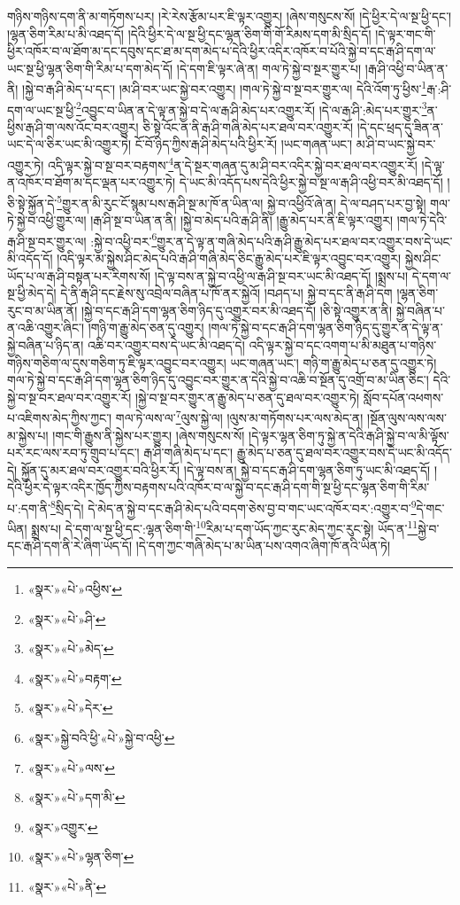 གཉིས་གཉིས་དག་ནི་མ་གཏོགས་པར། །རེ་རེས་རྩོམ་པར་ཇི་ལྟར་འགྱུར། །ཞེས་གསུངས་སོ། །དེ་ཕྱིར་དེ་ལ་སྔ་ཕྱི་དང་། །ལྷན་ཅིག་རིམ་པ་མི་འཐད་དོ། །དེའི་ཕྱིར་དེ་ལ་སྔ་ཕྱི་དང་ལྷན་ཅིག་གི་གོ་རིམས་དག་མི་སྲིད་དོ། །དེ་ལྟར་གང་གི་ཕྱིར་འཁོར་བ་ལ་ཐོག་མ་དང་དབུས་དང་ཐ་མ་དག་མེད་པ་དེའི་ཕྱིར་འདིར་འཁོར་བ་པོའི་སྐྱེ་བ་དང་རྒ་ཤི་དག་ལ་ཡང་སྔ་ཕྱི་ལྷན་ཅིག་གི་རིམ་པ་དག་མེད་དོ། །དེ་དག་ཇི་ལྟར་ཞེ་ན། གལ་ཏེ་སྐྱེ་བ་སྔར་གྱུར་པ། །རྒ་ཤི་འཕྱི་བ་ཡིན་ན་ནི། །སྐྱེ་བ་རྒ་ཤི་མེད་པ་དང་། །མ་ཤི་བར་ཡང་སྐྱེ་བར་འགྱུར། །གལ་ཏེ་སྐྱེ་བ་སྔ་བར་གྱུར་ལ། དེའི་འོག་ཏུ་ཕྱིས་\footnote{«སྣར་»«པེ་»འཕྱིས་}རྒ་:ཤི་དག་ལ་ཡང་སྔ་ཕྱི་\footnote{«སྣར་»«པེ་»ཤི་}འབྱུང་བ་ཡིན་ན་དེ་ལྟ་ན་སྐྱེ་བ་དེ་ལ་རྒ་ཤི་མེད་པར་འགྱུར་རོ། །དེ་ལ་རྒ་ཤི་:མེད་པར་གྱུར་\footnote{«སྣར་»«པེ་»མེད་}ན་ཕྱིས་རྒ་ཤི་ག་ལས་འོང་བར་འགྱུར། ཅི་སྟེ་འོང་ན་ནི་རྒ་ཤི་གཞི་མེད་པར་ཐལ་བར་འགྱུར་རོ། །དེ་དང་ཕྲད་དུ་ཟིན་ན་ཡང་དེ་ལ་ཅིར་ཡང་མི་འགྱུར་ཏེ། ངོ་བོ་ཉིད་ཀྱིས་རྒ་ཤི་མེད་པའི་ཕྱིར་རོ། །ཡང་གཞན་ཡང་། མ་ཤི་བ་ཡང་སྐྱེ་བར་འགྱུར་ཏེ། འདི་ལྟར་སྐྱེ་བ་སྔ་བར་བརྟགས་\footnote{«སྣར་»«པེ་»བརྟག་}ན་དེ་སྔར་གཞན་དུ་མ་ཤི་བར་འདིར་སྐྱེ་བར་ཐལ་བར་འགྱུར་རོ། །དེ་ལྟ་ན་འཁོར་བ་ཐོག་མ་དང་ལྡན་པར་འགྱུར་ཏེ། དེ་ཡང་མི་འདོད་པས་དེའི་ཕྱིར་སྐྱེ་བ་སྔ་ལ་རྒ་ཤི་འཕྱི་བར་མི་འཐད་དོ། །ཅི་སྟེ་སྐྱོན་དེ་\footnote{«སྣར་»«པེ་»དེར་}གྱུར་ན་མི་རུང་ངོ་སྙམ་པས་རྒ་ཤི་སྔ་མ་ཁོ་ན་ཡིན་ལ། སྐྱེ་བ་འཕྱིའོ་ཞེ་ན། དེ་ལ་བཤད་པར་བྱ་སྟེ། གལ་ཏེ་སྐྱེ་བ་འཕྱི་གྱུར་ལ། །རྒ་ཤི་སྔ་བ་ཡིན་ན་ནི། །སྐྱེ་བ་མེད་པའི་རྒ་ཤི་ནི། །རྒྱུ་མེད་པར་ནི་ཇི་ལྟར་འགྱུར། །གལ་ཏེ་དེའི་རྒ་ཤི་སྔ་བར་གྱུར་ལ། :སྐྱེ་བ་འཕྱི་བར་\footnote{«སྣར་»སྐྱེ་བའི་ཕྱི་«པེ་»སྐྱེ་བ་འཕྱི་}གྱུར་ན་དེ་ལྟ་ན་གཞི་མེད་པའི་རྒ་ཤི་རྒྱུ་མེད་པར་ཐལ་བར་འགྱུར་བས་དེ་ཡང་མི་འདོད་དོ། །འདི་ལྟར་མ་སྐྱེས་ཤིང་མེད་པའི་རྒ་ཤི་གཞི་མེད་ཅིང་རྒྱུ་མེད་པར་ཇི་ལྟར་འབྱུང་བར་འགྱུར། སྐྱེས་ཤིང་ཡོད་པ་ལ་རྒ་ཤི་བསྟན་པར་རིགས་སོ། །དེ་ལྟ་བས་ན་སྐྱེ་བ་འཕྱི་ལ་རྒ་ཤི་སྔ་བར་ཡང་མི་འཐད་དོ། །སྨྲས་པ། དེ་དག་ལ་སྔ་ཕྱི་མེད་དེ། དེ་ནི་རྒ་ཤི་དང་རྗེས་སུ་འབྲེལ་བཞིན་པ་ཁོ་ནར་སྐྱེའོ། །བཤད་པ། སྐྱེ་བ་དང་ནི་རྒ་ཤི་དག །ལྷན་ཅིག་རུང་བ་མ་ཡིན་ནོ། །སྐྱེ་བ་དང་རྒ་ཤི་དག་ལྷན་ཅིག་ཉིད་དུ་འགྱུར་བར་མི་འཐད་དོ། །ཅི་སྟེ་འགྱུར་ན་ནི། སྐྱེ་བཞིན་པ་ན་འཆི་འགྱུར་ཞིང་། །གཉི་ག་རྒྱུ་མེད་ཅན་དུ་འགྱུར། །གལ་ཏེ་སྐྱེ་བ་དང་རྒ་ཤི་དག་ལྷན་ཅིག་ཉིད་དུ་གྱུར་ན་དེ་ལྟ་ན་སྐྱེ་བཞིན་པ་ཉིད་ན། འཆི་བར་འགྱུར་བས་དེ་ཡང་མི་འཐད་དེ། འདི་ལྟར་སྐྱེ་བ་དང་འགག་པ་མི་མཐུན་པ་གཉིས་གཉིས་གཅིག་ལ་དུས་གཅིག་ཏུ་ཇི་ལྟར་འབྱུང་བར་འགྱུར། ཡང་གཞན་ཡང་། གཉི་ག་རྒྱུ་མེད་པ་ཅན་དུ་འགྱུར་ཏེ། གལ་ཏེ་སྐྱེ་བ་དང་རྒ་ཤི་དག་ལྷན་ཅིག་ཉིད་དུ་འབྱུང་བར་གྱུར་ན་དེའི་སྐྱེ་བ་འཆི་བ་སྔོན་དུ་འགྲོ་བ་མ་ཡིན་ཅིང་། དེའི་སྐྱེ་བ་སྔ་བར་ཐལ་བར་འགྱུར་རོ། །སྐྱེ་བ་སྔ་བར་གྱུར་ན་རྒྱུ་མེད་པ་ཅན་དུ་ཐལ་བར་འགྱུར་ཏེ། སློབ་དཔོན་འཕགས་པ་འཇིགས་མེད་ཀྱིས་ཀྱང་། གལ་ཏེ་ལས་ལ་\footnote{«སྣར་»«པེ་»ལས་}ལུས་སྐྱེ་ལ། །ལུས་མ་གཏོགས་པར་ལས་མེད་ན། །སྔོན་ལུས་ལས་ལས་མ་སྐྱེས་པ། །གང་གི་རྒྱུས་ནི་སྐྱེས་པར་གྱུར། །ཞེས་གསུངས་སོ། །དེ་ལྟར་ལྷན་ཅིག་ཏུ་སྐྱེ་ན་དེའི་རྒ་ཤི་སྐྱེ་བ་ལ་མི་ལྟོས་པར་རང་ལས་རབ་ཏུ་གྲུབ་པ་དང་། རྒ་ཤི་གཞི་མེད་པ་དང་། རྒྱུ་མེད་པ་ཅན་དུ་ཐལ་བར་འགྱུར་བས་དེ་ཡང་མི་འདོད་དེ། སྐྱོན་དུ་མར་ཐལ་བར་འགྱུར་བའི་ཕྱིར་རོ། །དེ་ལྟ་བས་ན། སྐྱེ་བ་དང་རྒ་ཤི་དག་ལྷན་ཅིག་ཏུ་ཡང་མི་འཐད་དོ། །དེའི་ཕྱིར་དེ་ལྟར་འདིར་ཁྱོད་ཀྱིས་བརྟགས་པའི་འཁོར་བ་ལ་སྐྱེ་བ་དང་རྒ་ཤི་དག་གི་སྔ་ཕྱི་དང་ལྷན་ཅིག་གི་རིམ་པ་:དག་ནི་\footnote{«སྣར་»«པེ་»དག་མི་}སྲིད་དེ། དེ་མེད་ན་སྐྱེ་བ་དང་རྒ་ཤི་མེད་པའི་བདག་ཅེས་བྱ་བ་གང་ཡང་འཁོར་བར་:འགྱུར་བ་\footnote{«སྣར་»འགྱུར་}དེ་གང་ཡིན། སྨྲས་པ། དེ་དག་ལ་སྔ་ཕྱི་དང་:ལྷན་ཅིག་གི་\footnote{«སྣར་»«པེ་»ལྷན་ཅིག་}རིམ་པ་དག་ཡོད་ཀྱང་རུང་མེད་ཀྱང་རུང་སྟེ། ཡོད་ན་\footnote{«སྣར་»«པེ་»ནི་}སྐྱེ་བ་དང་རྒ་ཤི་དག་ནི་རེ་ཞིག་ཡོད་དོ། །དེ་དག་ཀྱང་གཞི་མེད་པ་མ་ཡིན་པས་འགའ་ཞིག་ཁོ་ནའི་ཡིན་ཏེ། 